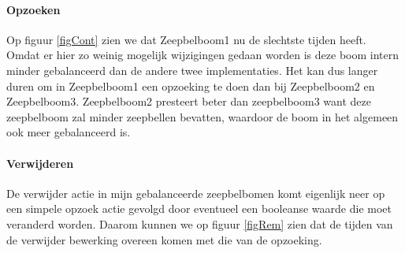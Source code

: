 \documentclass[12pt,hidelinks]{article}
\begin{document}
    \paragraph{Opzoeken}
    Op figuur \ref{figCont} zien we dat Zeepbelboom1 nu de slechtste tijden heeft.
    Omdat er hier zo weinig mogelijk wijzigingen gedaan worden is deze boom intern minder gebalanceerd dan de andere twee implementaties.
    Het kan dus langer duren om in Zeepbelboom1 een opzoeking te doen dan bij Zeepbelboom2 en Zeepbelboom3.
    Zeepbelboom2 presteert beter dan zeepbelboom3 want deze zeepbelboom zal minder zeepbellen bevatten, waardoor de boom in het algemeen ook meer gebalanceerd is.
    \paragraph{Verwijderen}
    De verwijder actie in mijn gebalanceerde zeepbelbomen komt eigenlijk neer op een simpele opzoek actie gevolgd door eventueel een booleanse waarde die moet veranderd worden.
    Daarom kunnen we op figuur \ref{figRem} zien dat de tijden van de verwijder bewerking overeen komen met die van de opzoeking.
    
\end{document}
